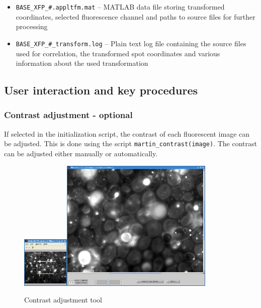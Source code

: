 \documentclass[10pt,a4paper,onepage,DIV12]{scrartcl}
\begin{document}
\begin{itemize}
\item \texttt{BASE\_XFP\_\#.appltfm.mat} -- MATLAB data file storing transformed coordinates, selected fluorescence channel and paths to source files for further processing
\item \texttt{BASE\_XFP\_\#\_transform.log} -- Plain text log file containing the source files used for correlation, the transformed spot coordinates and various information about the used transformation
\end{itemize}

\newpage
\subsection{User interaction and key procedures}
\subsubsection{Contrast adjustment - optional}
If selected in the initialization script, the contrast of each fluorescent image can be adjusted. This is done using the script \verb|martin_contrast(image)|. The contrast can be adjusted either manually or automatically.
\begin{figure}
 \centering
 \includegraphics[width=0.2\textwidth]{images/contr_overview.jpg}\includegraphics[width=0.65\textwidth]{images/contr.jpg}
 \caption{Contrast adjustment tool}
 \label{fig:contrast}
\end{figure}
\end{document}
